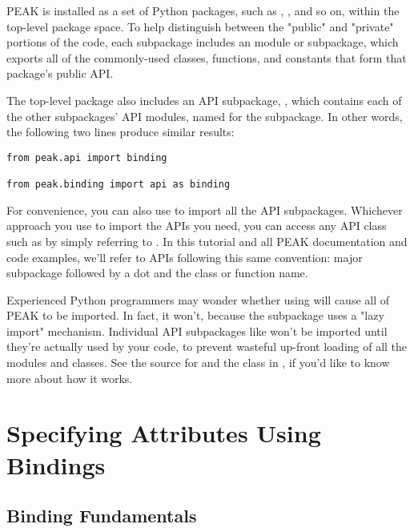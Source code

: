 PEAK is installed as a set of Python packages, such as ,
, and so on, within the top-level  package
space.  To help distinguish between the "public" and "private" portions of
the code, each subpackage includes an  module or subpackage, which
exports all of the commonly-used classes, functions, and constants that form
that package's public API.

The top-level package also includes an API subpackage, , which
contains each of the other subpackages' API modules, named for the subpackage.
In other words, the following two lines produce similar results:

\begin{verbatim}
from peak.api import binding

from peak.binding import api as binding
\end{verbatim}

For convenience, you can also use  to import all
the API subpackages.  Whichever approach you use to import the APIs you need,
you can access any  API class such as 
by simply referring to .  In this tutorial and all PEAK
documentation and code examples, we'll refer to APIs following this same
convention: major subpackage followed by a dot and the class or function name.

\begin{notice}
Experienced Python programmers may wonder whether using
 will cause all of PEAK to be imported.  In
fact, it won't, because the  subpackage uses a 
"lazy import" mechanism.  Individual API subpackages like 
won't be imported until they're actually used by your code, to prevent wasteful
up-front loading of all the modules and classes.  See the source for
 and the  class in
, if you'd like to know more about how it works.
\end{notice} 

\newpage

\section{Specifying Attributes Using Bindings}

\subsection{Binding Fundamentals}

